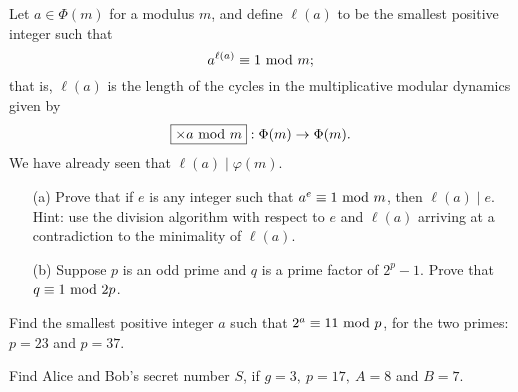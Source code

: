 \begin{problem}\label{Problem 14.1}
Let $a \in \Phi(m)$ for a modulus $m$, and define $\ell(a)$ to be the smallest positive integer such that 
\[a^{\ell(a)} \equiv 1 \text{ mod }{m};\]
that is, $\ell(a)$ is the length of the cycles in the multiplicative modular dynamics given by \[\fbox{$\times a \text{ mod }{m}$}:\Phi(m) \to \Phi(m).\]
We have already seen that $\ell(a) \mid \varphi(m)$.
\begin{itemize}
\item[(a)] Prove that if $e$ is any integer such that $a^e \equiv 1 \text{ mod }{m}$, then $\ell(a) \mid e$.\\
{\footnotesize Hint: use the division algorithm with respect to $e$ and $\ell(a)$ arriving at a contradiction to the minimality of $\ell(a)$.}
\item[(b)] Suppose $p$ is an odd prime and $q$ is a prime factor of $2^p - 1$. Prove that $q \equiv 1 \text{ mod }{2p}$.
\end{itemize}
\end{problem}

\vspace*{0.1in}

\begin{problem}\label{Problem 14.2}
Find the smallest positive integer $a$ such that $2^a \equiv 11 \text{ mod }{p}$, for the two primes: $p = 23$ and $p = 37$.
\end{problem}

\vspace*{0.1in}

\begin{problem}\label{Problem 14.3}
Find Alice and Bob's secret number $S$, if $g = 3,\ p = 17,\ A = 8$ and $B = 7$.
\end{problem}